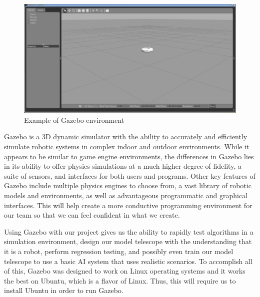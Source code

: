 \documentclass[12pt]{report}
\begin{document}
\begin{figure}[h]
	\centering
	\includegraphics[width=0.98\linewidth]{gazebo}
	\caption{Example of Gazebo environment}
\end{figure}

Gazebo is a 3D dynamic simulator with the ability to accurately and efficiently simulate robotic systems in complex indoor and outdoor environments. While it appears to be similar to game engine environments, the differences in Gazebo lies in its ability to offer physics simulations at a much higher degree of fidelity, a suite of sensors, and interfaces for both users and programs.\cite{GazeboDescription} Other key features of Gazebo include multiple physics engines to choose from, a vast library of robotic models and environments, as well as advantageous programmatic and graphical interfaces. This will help create a more conductive programming environment for our team so that we can feel confident in what we create. 

\newpage

Using Gazebo with our project gives us the ability to rapidly test algorithms in a simulation environment, design our model telescope with the understanding that it is a robot, perform regression testing, and possibly even train our model telescope to use a basic AI system that uses realistic scenarios. To accomplish all of this, Gazebo was designed to work on Linux operating systems and it works the best on Ubuntu, which is a flavor of Linux. Thus, this will require us to install Ubuntu in order to run Gazebo. 
\end{document}
